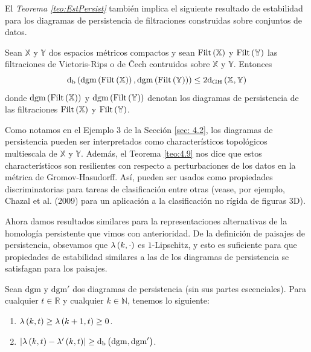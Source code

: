 El \emph{Teorema \ref{teo:EstPersist}} tambi\'en implica el siguiente resultado
de estabilidad para los diagramas de persistencia de filtraciones construidas sobre
conjuntos de datos.

\begin{teorema}\label{teo:4.9}
    Sean $\mathbb{X}$ y $\mathbb{Y}$ dos espacios m\'etricos compactos y sean
    $\mathrm{Filt}\left(\mathbb{X}\right)$ y $\mathrm{Filt}\left(\mathbb{Y}\right)$ las
    filtraciones de Vietoris-Rips o de \v Cech contruidos sobre $\mathbb{X}$ y
    $\mathbb{Y}$. Entonces
    \begin{equation*}
        \mathrm{d}_{\mathrm{b}}
        \left(\mathrm{dgm}\left(\mathrm{Filt}\left(\mathbb{X}\right)\right),
        \mathrm{dgm}\left(\mathrm{Filt}\left(\mathbb{Y}\right)\right)\right)\leq
        2\mathrm{d}_{\mathrm{GH}}\left(\mathbb{X},\mathbb{Y}\right)
    \end{equation*}
    donde $\mathrm{dgm}\left(\mathrm{Filt}\left(\mathbb{X}\right)\right)$ y
    $\mathrm{dgm}\left(\mathrm{Filt}\left(\mathbb{Y}\right)\right)$ denotan los
    diagramas de persistencia de las filtraciones $\mathrm{Filt}\left(\mathbb{X}\right)$ y
    $\mathrm{Filt}\left(\mathbb{Y}\right)$.
\end{teorema}

Como notamos en el Ejemplo 3 de la Secci\'on \ref{sec: 4.2}, los diagramas de persistencia pueden
ser interpretados como character\'isticos topol\'ogicos multiescala de 
$\mathbb{X}$ y $\mathbb{Y}$. Adem\'as, el Teorema \ref{teo:4.9} nos dice que estos
character\'isticos son resilientes con respecto a perturbaciones de los datos en la
m\'etrica de Gromov-Hasudorff. As\'i, pueden ser usados como propiedades discriminatorias
para tareas de clasificaci\'on entre otras (vease, por ejemplo, Chazal et al. (2009)\cite{chazal2009b}
para un aplicaci\'on a la clasificaci\'on no r\'igida de figuras 3D).

Ahora damos resultados similares para la representaciones alternativas de la homolog\'ia
persistente que vimos con anterioridad. De la definici\'on de paisajes de persistencia,
obsevamos que $\lambda\left(k,\cdot\right)$ es $1$-Lipschitz, y esto es suficiente para que
propiedades de estabilidad similares a las de los diagramas de persistencia se satisfagan
para los paisajes.

\begin{proposicion}
    Sean $\mathrm{dgm}$ y $\mathrm{dgm}'$ dos diagramas de persistencia (sin sus partes escenciales).
    Para cualquier $t\in\mathbb{R}$ y cualquier $k\in\mathbb{N}$, tenemos lo siguiente:

    \begin{enumerate}[label=(\roman*)]
        \item $\lambda\left(k,t\right)\geq\lambda\left(k+1,t\right)\geq 0$.
        \item $\left|\lambda\left(k,t\right)-\lambda'\left(k,t\right)\right|\geq
        \mathrm{d}_{\mathrm{b}}\left(\mathrm{dgm},\mathrm{dgm}'\right)$.
    \end{enumerate}
\end{proposicion}

